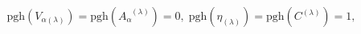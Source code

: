 \begin{equation}
\mathrm{pgh}\left( V_{\alpha (\lambda )}\right) =\mathrm{pgh}\left(
A_{\alpha }^{\;\;(\lambda )}\right) =0,\;\mathrm{pgh}\left( \eta _{(\lambda
)}\right) =\mathrm{pgh}\left( C^{(\lambda )}\right) =1,  \label{bf39}
\end{equation}

